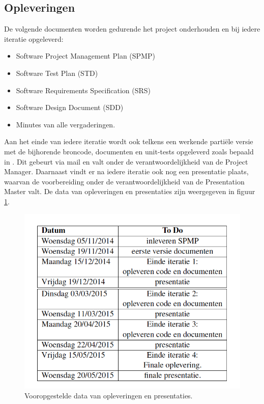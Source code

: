 \documentclass{article}
\begin{document}
\subsection{Opleveringen}

De volgende documenten worden gedurende het project onderhouden en bij iedere iteratie opgeleverd:

\begin{itemize}
\item Software Project Management Plan (SPMP)
\item Software Test Plan (STD)
\item Software Requirements Specification (SRS)
\item Software Design Document (SDD)
\item Minutes van alle vergaderingen.
\end{itemize}

Aan het einde van iedere iteratie wordt ook telkens een werkende parti\"{e}le versie met de bijhorende broncode, documenten en unit-tests opgeleverd zoals bepaald in
\cite{Xtreport:organisatie}. Dit gebeurt via mail en valt onder de verantwoordelijkheid van de Project Manager. Daarnaast vindt er na iedere iteratie ook nog een presentatie plaats, waarvan de voorbereiding onder de verantwoordelijkheid van de Presentation Master valt. De data van opleveringen en presentaties zijn weergegeven in figuur \ref{Kalender}.

\begin{figure}[h!]
\centering
 \includegraphics[width=120mm]{kalender.png}
 \caption{Vooropgestelde data van opleveringen en presentaties.}
 \label{Kalender}
\end{figure}
\end{document}
